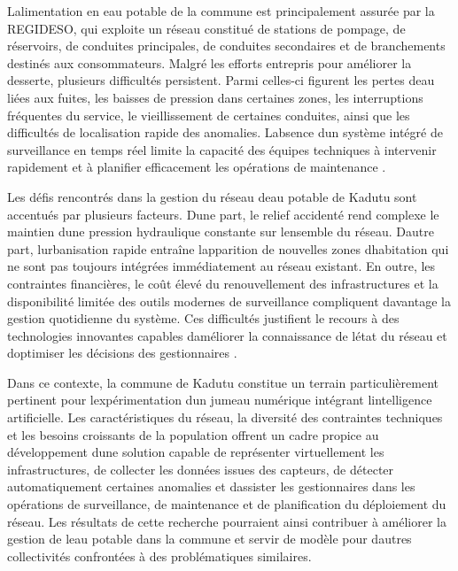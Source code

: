 \documentclass[12pt,a4paper,oneside]{report}
\begin{document}
L\textquotesingle alimentation en eau potable de la commune est
principalement assurée par la REGIDESO, qui exploite un réseau constitué
de stations de pompage, de réservoirs, de conduites principales, de
conduites secondaires et de branchements destinés aux consommateurs.
Malgré les efforts entrepris pour améliorer la desserte, plusieurs
difficultés persistent. Parmi celles-ci figurent les pertes
d\textquotesingle eau liées aux fuites, les baisses de pression dans
certaines zones, les interruptions fréquentes du service, le
vieillissement de certaines conduites, ainsi que les difficultés de
localisation rapide des anomalies. L\textquotesingle absence
d\textquotesingle un système intégré de surveillance en temps réel
limite la capacité des équipes techniques à intervenir rapidement et à
planifier efficacement les opérations de maintenance \cite{ref86}.

Les défis rencontrés dans la gestion du réseau d\textquotesingle eau
potable de Kadutu sont accentués par plusieurs facteurs.
D\textquotesingle une part, le relief accidenté rend complexe le
maintien d\textquotesingle une pression hydraulique constante sur
l\textquotesingle ensemble du réseau. D\textquotesingle autre part,
l\textquotesingle urbanisation rapide entraîne
l\textquotesingle apparition de nouvelles zones
d\textquotesingle habitation qui ne sont pas toujours intégrées
immédiatement au réseau existant. En outre, les contraintes financières,
le coût élevé du renouvellement des infrastructures et la disponibilité
limitée des outils modernes de surveillance compliquent davantage la
gestion quotidienne du système. Ces difficultés justifient le recours à
des technologies innovantes capables d\textquotesingle améliorer la
connaissance de l\textquotesingle état du réseau et
d\textquotesingle optimiser les décisions des gestionnaires \cite{ref88}.

Dans ce contexte, la commune de Kadutu constitue un terrain
particulièrement pertinent pour l\textquotesingle expérimentation
d\textquotesingle un jumeau numérique intégrant
l\textquotesingle intelligence artificielle. Les caractéristiques du
réseau, la diversité des contraintes techniques et les besoins
croissants de la population offrent un cadre propice au développement
d\textquotesingle une solution capable de représenter virtuellement les
infrastructures, de collecter les données issues des capteurs, de
détecter automatiquement certaines anomalies et
d\textquotesingle assister les gestionnaires dans les opérations de
surveillance, de maintenance et de planification du déploiement du
réseau. Les résultats de cette recherche pourraient ainsi contribuer à
améliorer la gestion de l\textquotesingle eau potable dans la commune et
servir de modèle pour d\textquotesingle autres collectivités confrontées
à des problématiques similaires.
\end{document}
